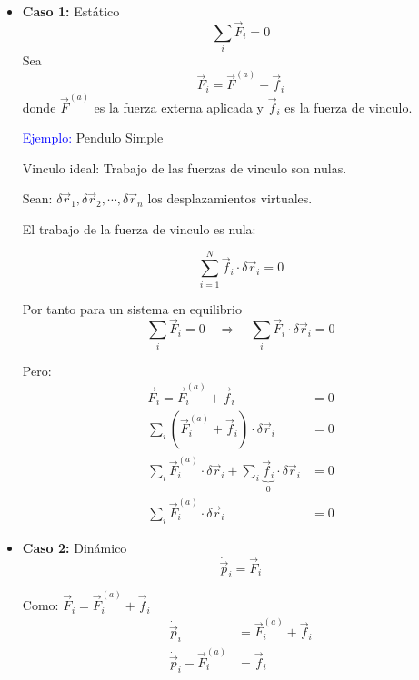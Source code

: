 \documentclass[../main]{subfiles}
\begin{document}
\begin{itemize}
    \item \textbf{Caso 1:} Estático
    \begin{equation}
        \sum_i \vec{F}_i =0
    \end{equation}
    Sea 
    \begin{equation}
        \vec{F}_i=\vec{F}^{(a)}+\vec{f}_i
    \end{equation}
    donde $\vec{F}^{(a)}$ es la fuerza externa aplicada y $\vec{f}_i$ es la fuerza de vinculo.

    \textcolor{blue}{Ejemplo:} Pendulo Simple

    Vinculo ideal: Trabajo de las fuerzas de vinculo son nulas.

    Sean: $\delta \vec{r}_1, \delta \vec{r}_2, \cdots, \delta \vec{r}_n$ los desplazamientos virtuales.

    El trabajo de la fuerza de vinculo es nula:

    \begin{equation}
        \sum_{i=1}^N \vec{f}_i \cdot \delta \vec{r}_i = 0
    \end{equation}
    
    Por tanto para un sistema en equilibrio
    \begin{equation}
        \sum_i \vec{F}_i = 0 \quad \Rightarrow \quad \sum_i \vec{F}_i \cdot \delta \vec{r}_i =0
    \end{equation}

    Pero:
    \begin{equation}
        \begin{split}
            \vec{F}_i=\vec{F}^{(a)}_i+\vec{f}_i&=0 \\
            \sum_i \left(\vec{F}^{(a)}_i+\vec{f}_i\right) \cdot \delta \vec{r}_i&=0\\
            \sum_i \vec{F}^{(a)}_i\cdot \delta \vec{r}_i+\sum_i \underbrace{\vec{f}_i}_{0}\cdot \delta \vec{r}_i&=0 \\
            \sum_i \vec{F}^{(a)}_i \cdot \delta \vec{r}_i &=0    
        \end{split}
    \end{equation}

    \item \textbf{Caso 2:} Dinámico
    \begin{equation}
        \dot{\vec{p}}_i=\vec{F}_i
    \end{equation}

    Como: $\vec{F}_i=\vec{F}^{(a)}_i+\vec{f}_i$
    \begin{equation}
        \begin{split}
            \dot{\vec{p}}_i&=\vec{F}^{(a)}_i+\vec{f}_i \\
            \dot{\vec{p}}_i-\vec{F}^{(a)}_i&=\vec{f}_i
        \end{split}
    \end{equation}


\end{itemize}
\end{document}
